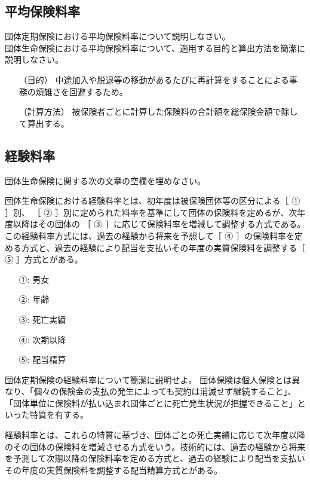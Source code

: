 \documentclass[report,gutter=10mm,fore-edge=10mm,uplatex,dvipdfmx]{jlreq}
\begin{document}
\subsection{平均保険料率}
団体定期保険における平均保険料率について説明しなさい。\\
団体生命保険における平均保険料率について、適用する目的と算出方法を簡潔に説明しなさい。
\answer{}
\begin{itemize}
\item[ （目的）] 中途加入や脱退等の移動があるたびに再計算をすることによる事務の煩雑さを回避するため。
\item[ （計算方法）] 被保険者ごとに計算した保険料の合計額を総保険金額で除して算出する。
\end{itemize}

\subsection{経験料率}
団体生命保険に関する次の文章の空欄を埋めなさい。

団体生命保険における経験料率とは、初年度は被保険団体等の区分による［ ① ］別、
［ ② ］別に定められた料率を基準にして団体の保険料を定めるが、次年度以降はその団体の
［ ③ ］に応じて保険料率を増減して調整する方式である。この経験料率方式には、過去の経験から将来を予想して［ ④ ］の保険料率を定める方式と、過去の経験により配当を支払いその年度の実質保険料を調整する［ ⑤ ］方式とがある。
\answer{}
\begin{itemize}
\item[ ①: ] 男女
\item[ ②: ] 年齢
\item[ ③: ] 死亡実績
\item[ ④: ] 次期以降
\item[ ⑤: ] 配当精算
\end{itemize}

団体定期保険の経験料率について簡潔に説明せよ。
\answer{}
団体保険は個人保険とは異なり、「個々の保険金の支払の発生によっても契約は消滅せず継続すること」、「団体単位に保険料が払い込まれ団体ごとに死亡発生状況が把握できること」といった特質を有する。

経験料率とは、これらの特質に基づき、団体ごとの死亡実績に応じて次年度以降のその団体の保険料を増減させる方式をいう。技術的には、過去の経験から将来を予測して次期以降の保険料率を定める方式と、過去の経験により配当を支払いその年度の実質保険料を調整する配当精算方式とがある。
\end{document}
